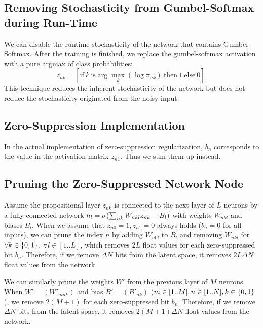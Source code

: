 \documentclass[10pt,letterpaper]{article}
\begin{document}
\subsection{Removing Stochasticity from Gumbel-Softmax during Run-Time}
\label{argmax-implementation}
We can disable the runtime stochasticity of the network that contains Gumbel-Softmax.
After the training is finished, we replace the gumbel-softmax activation with
a pure argmax of class probabilities:
\[
 z_{nk} = [ \text{if}\ k\ \text{is} \arg \max_k (\log \pi_{nk})\ \text{then}\ 1\ \text{else}\ 0 ].
\]
% 
This technique reduces the inherent stochasticity of the network
but does not reduce the stochasticity originated from the noisy input.

\subsection{Zero-Suppression Implementation}
\label{zsae-implementation}
In the actual implementation of zero-suppression regularization,
$b_n$ corresponds to the value in the activation matrix $z_{n1}$.
Thus we sum them up instead.

\subsection{Pruning the Zero-Suppressed Network Node}
\label{pruning-implementation}

Assume the propositional layer $z_{nk}$ is connected to the next layer of $L$ neurons
by a fully-connected network $h_l=\sigma{\left(\sum_{nk} W_{nkl}z_{nk}+B_l\right)}$
with weights $W_{nkl}$ and biases $B_l$.
When we assume that $z_{n0}=1,z_{n1}=0$ always holds ($b_n=0$ for all inputs),
we can prune the index $n$
by adding $W_{n0l}$ to $B_l$ and removing $W_{nkl}$ for $\forall k\in{\left\{0,1\right\}}$, $\forall l \in [1..L]$,
which removes $2L$ float values for each zero-suppressed bit $b_n$.
Therefore, if we remove $\Delta N$ bits from the latent space, it removes $2L\Delta N$ float values from the network.
 
We can similarly prune the weights $W'$ from the previous layer of $M$ neurons.
When $W'=(W'_{mnk})$ and bias $B'=(B'_{nk})$ ($m\in[1..M], n\in[1..N], k\in {\left\{0,1\right\}}$),
we remove $2(M+1)$ for each zero-suppressed bit $b_n$.
Therefore, if we remove $\Delta N$ bits from the latent space, it removes $2(M+1)\Delta N$ float values from the network.
\end{document}

